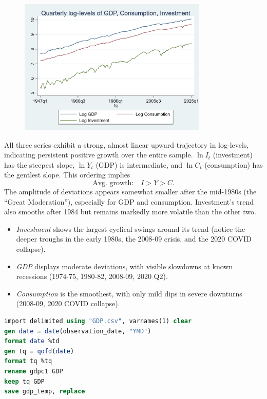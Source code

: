 \documentclass[a4paper,12pt]{article} %
\theoremstyle{nonitalic}
\newenvironment{solution}[1]
  {\renewcommand\theinnercustomsol{#1}%
   \innercustomsol}
  {\endinnercustomsol}
\newcounter{solutionctr}[section]
\renewcommand{\thesolutionctr}{(\alph{solutionctr})}
\newenvironment{autosolution}
  {\refstepcounter{solutionctr}%
   \begin{solution}{\thesolutionctr}}
  {\end{solution}}
\begin{document}
\begin{autosolution}
    \

    \begin{figure}[htbp!]
        \centering
        \includegraphics[width=0.8\textwidth]{a.png}
    \end{figure}
    All three series exhibit a strong, almost linear upward trajectory in log-levels, indicating persistent positive growth over the entire sample.
    \(\ln I_t\) (investment) has the steepest slope, \(\ln Y_t\) (GDP) is intermediate, and \(\ln C_t\) (consumption) has the gentlest slope.
    This ordering implies
    \[
      \text{Avg.\ growth:}\quad I > Y > C.
    \]
    The amplitude of deviations appears somewhat smaller after the mid-1980s (the “Great Moderation”), especially for GDP and consumption.  
    Investment's trend also smooths after 1984 but remains markedly more volatile than the other two.
    \begin{itemize}
      \item \emph{Investment} shows the largest cyclical swings around its trend (notice the deeper troughs in the early 1980s, the 2008-09 crisis, and the 2020 COVID collapse).  
      \item \emph{GDP} displays moderate deviations, with visible slowdowns at known recessions (1974-75, 1980-82, 2008-09, 2020 Q2).  
      \item \emph{Consumption} is the smoothest, with only mild dips in severe downturns (2008-09, 2020 COVID collapse).
    \end{itemize}
    \begin{lstlisting}[language=Stata]
import delimited using "GDP.csv", varnames(1) clear
gen date = date(observation_date, "YMD") 
format date %td                      
gen tq = qofd(date)               
format tq %tq   
rename gdpc1 GDP
keep tq GDP
save gdp_temp, replace


\end{lstlisting}
\end{autosolution}
\end{document}
